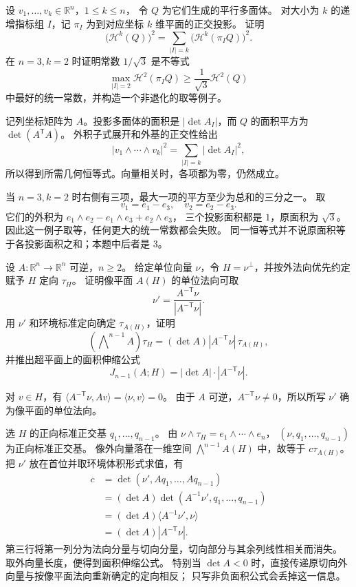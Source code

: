 \begin{exercise}\label{b1:ex:app-b-projection-volume}
设 \(v_1,\ldots,v_k\in\mathbb R^n\)，\(1\leq k\leq n\)，
令 \(Q\) 为它们生成的平行多面体。
对大小为 \(k\) 的递增指标组 \(I\)，记 \(\pi_I\) 为到对应坐标 \(k\) 维平面的正交投影。
证明
\[
 \bigl(\mathcal H^k(Q)\bigr)^2
   =\sum_{|I|=k}\bigl(\mathcal H^k(\pi_IQ)\bigr)^2.
\]
在 \(n=3,k=2\) 时证明常数 \(1/\sqrt3\) 是不等式
\[
 \max_{|I|=2}\mathcal H^2(\pi_IQ)
   \geq\frac1{\sqrt3}\mathcal H^2(Q)
\]
中最好的统一常数，并构造一个非退化的取等例子。
\end{exercise}
\begin{solution}
记列坐标矩阵为 \(A\)。投影多面体的面积是
\(|\det A_I|\)，而 \(Q\) 的面积平方为
\(\det(A^{\mathsf T}A)\)。
外积子式展开和外基的正交性给出
\[
 |v_1\wedge\cdots\wedge v_k|^2=\sum_{|I|=k}|\det A_I|^2,
\]
所以得到所需几何恒等式。向量相关时，各项都为零，仍然成立。

当 \(n=3,k=2\) 时右侧有三项，最大一项的平方至少为总和的三分之一。
取
\[
 v_1=e_1-e_3,\quad v_2=e_2-e_3.
\]
它们的外积为
\(e_1\wedge e_2-e_1\wedge e_3+e_2\wedge e_3\)，
三个投影面积都是 \(1\)，原面积为 \(\sqrt3\)。
因此这一例子取等，任何更大的统一常数都会失败。
同一恒等式并不说原面积等于各投影面积之和；本题中后者是 \(3\)。
\end{solution}

\begin{exercise}\label{b1:ex:app-b-normal-transform}
设 \(A:\mathbb R^n\rightarrow\mathbb R^n\) 可逆，\(n\geq2\)。
给定单位向量 \(\nu\)，令 \(H=\nu^\perp\)，并按外法向优先约定赋予 \(H\) 定向 \(\tau_H\)。
证明像平面 \(A(H)\) 的单位法向可取
\[
 \nu'=\frac{A^{-\mathsf T}\nu}{|A^{-\mathsf T}\nu|}.
\]
用 \(\nu'\) 和环境标准定向确定 \(\tau_{A(H)}\)，证明
\[
 (\bigwedge\nolimits^{n-1}A)\tau_H
   =(\det A)|A^{-\mathsf T}\nu|\,\tau_{A(H)},
\]
并推出超平面上的面积伸缩公式
\[
 J_{n-1}(A;H)=|\det A|\cdot|A^{-\mathsf T}\nu|.
\]
\end{exercise}
\begin{solution}
对 \(v\in H\)，有
\(\langle A^{-\mathsf T}\nu,Av\rangle=\langle\nu,v\rangle=0\)。
由于 \(A\) 可逆，\(A^{-\mathsf T}\nu\ne0\)，所以所写 \(\nu'\) 确为像平面的单位法向。

选 \(H\) 的正向标准正交基 \(q_1,\ldots,q_{n-1}\)。
由 \(\nu\wedge\tau_H=e_1\wedge\cdots\wedge e_n\)，
\((\nu,q_1,\ldots,q_{n-1})\) 为正向标准正交基。
像外向量落在一维空间 \(\bigwedge^{n-1}A(H)\) 中，故等于
\(c\tau_{A(H)}\)。把 \(\nu'\) 放在首位并取环境体积形式求值，有
\[
 \begin{aligned}
 c&=\det(\nu',Aq_1,\ldots,Aq_{n-1})\\
  &=(\det A)\det(A^{-1}\nu',q_1,\ldots,q_{n-1})\\
  &=(\det A)\langle A^{-1}\nu',\nu\rangle\\
  &=(\det A)|A^{-\mathsf T}\nu|.
 \end{aligned}
\]
第三行将第一列分为法向分量与切向分量，切向部分与其余列线性相关而消失。
取外向量长度，便得到面积伸缩公式。
特别当 \(\det A<0\) 时，直接传递原切向外向量与按像平面法向重新确定的定向相反；
只写非负面积公式会丢掉这一信息。
\end{solution}

